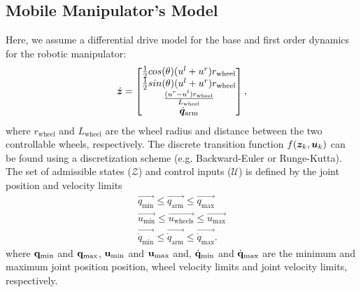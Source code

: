 \subsection{Mobile Manipulator's Model}%
\label{sub:transition_function}
%
 Here, we assume a differential drive model for the base and first order dynamics for the robotic manipulator:
\begin{equation}
    \dot{\bm{z}} = \begin{bmatrix} \frac{1}{2}cos(\theta)(u^l + u^r) r_{\textrm{wheel}} \\
                                      \frac{1}{2}sin(\theta)(u^l + u^r) r_{\textrm{wheel}} \\
                                      \frac{(u^r - u^l)r_{\textrm{wheel}}}{L_{\textrm{wheel}}} \\
                                      \dot{\bm{q}}_{\textrm{arm}} \end{bmatrix}, 
\end{equation}
where $r_{\textrm{wheel}}$ and $L_{\textrm{wheel}}$ are the wheel radius and distance between the two controllable wheels, respectively. The discrete transition function $f(\bm{z}_k, \bm{u}_k)$ can be found using a discretization scheme (e.g. Backward-Euler or Runge-Kutta).
The set of admissible states ($\mathcal{Z}$) and control inputs ($\mathcal{U}$) is defined by the joint position and velocity limits
\begin{equation}
  \begin{split}
    \vec{q_{\textrm{min}}} \leq \vec{q_{\textrm{arm}}} \leq \vec{q_{\textrm{max}}} \\ 
    \vec{u_{\textrm{min}}} \leq \vec{u_{\textrm{wheels}}} \leq \vec{u_{\textrm{max}}} \\
    \vec{\dot{q}_{\textrm{min}}} \leq \vec{\dot{q}_{\textrm{arm}}} \leq \vec{\dot{q}_{\textrm{max}}}.
\end{split}
\end{equation}
where $\mathbf{q}_{\textrm{min}}$ and $\mathbf{q}_{\textrm{max}}$, $\mathbf{u}_{\textrm{min}}$ and $\mathbf{u}_{\textrm{max}}$ and, $\dot{\mathbf{q}}_{\textrm{min}}$ and $\dot{\mathbf{q}}_{\textrm{max}}$ are the minimum and maximum joint position position, wheel velocity limits and joint velocity limits, respectively.

